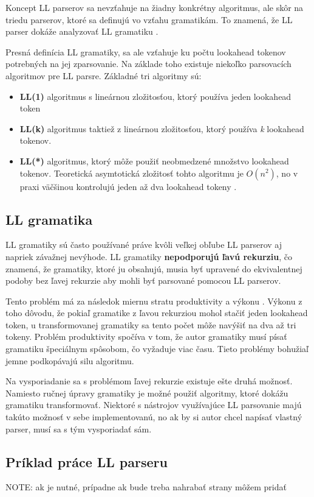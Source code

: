 Koncept LL parserov sa nevzťahuje na žiadny konkrétny algoritmus, ale skôr na triedu parserov, ktoré sa definujú vo vzťahu  gramatikám. To znamená, že LL parser dokáže analyzovať LL gramatiku \cite{haberman:hard_parsing}.

Presná definícia LL gramatiky, sa ale vzťahuje ku počtu lookahead tokenov potrebných na jej zparsovanie. Na základe toho existuje niekoľko parsovacích algoritmov pre LL parsre. Základné tri algoritmy sú:
\begin{itemize}
\item \textbf{LL(1)} algoritmus s lineárnou zložitosťou, ktorý používa jeden lookahead token 
\item \textbf{LL(k)} algoritmus taktiež z lineárnou zložitosťou, ktorý používa \textit{k} lookahead tokenov.
\item \textbf{LL(*)} algoritmus, ktorý môže použiť neobmedzené množstvo lookahead tokenov. Teoretická asymtotická zložitosť tohto algoritmu je $O(n^2)$, no v praxi väčšinou kontrolujú jeden až dva lookahead tokeny \cite{LL}.
\end{itemize}

\subsection{LL gramatika}\label{ll_grammar}
LL gramatiky sú často používané práve kvôli veľkej obľube LL parserov aj napriek závažnej nevýhode. LL gramatiky \textbf{nepodporujú ľavú rekurziu}, čo znamená, že gramatiky, ktoré ju obsahujú, musia byť upravené do ekvivalentnej podoby bez ľavej rekurzie aby mohli byť parsované pomocou LL parserov.

Tento problém má za následok miernu stratu produktivity a výkonu \cite{tomassetti:parsing}. Výkonu z toho dôvodu, že pokiaľ gramatike z ľavou rekurziou mohol stačiť jeden lookahead token, u transformovanej gramatiky sa tento počet môže navýšiť na dva až tri tokeny. Problém produktivity spočíva v tom, že autor gramatiky musí písať gramatiku špeciálnym spôsobom, čo vyžaduje viac času. Tieto problémy bohužiaľ jemne podkopávajú silu algoritmu.

Na vysporiadanie sa s problémom ľavej rekurzie existuje ešte druhá možnosť. Namiesto ručnej úpravy gramatiky je možné použiť algoritmy, ktoré dokážu gramatiku transformovať. Niektoré s nástrojov využívajúce LL parsovanie majú takúto možnosť v sebe implementovanú, no ak by si autor chcel napísať vlastný parser, musí sa s tým vysporiadať sám.

\subsection{Príklad práce LL parseru}
NOTE: ak je nutné, prípadne ak bude treba nahrabať strany môžem pridať

